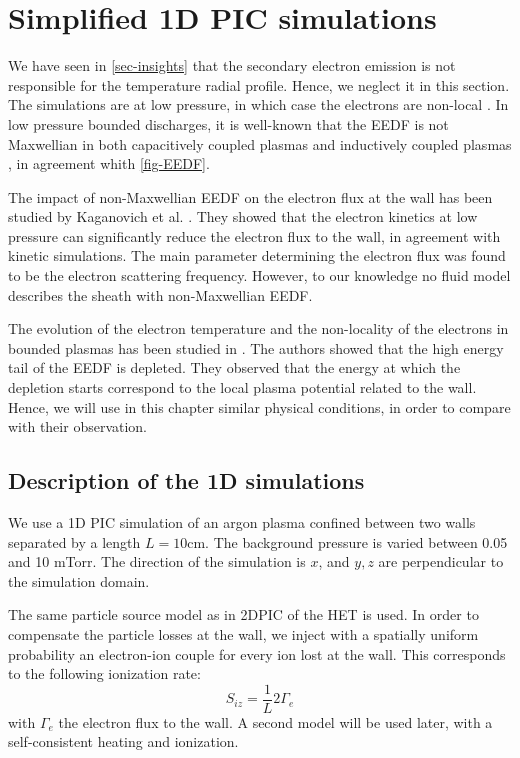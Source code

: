 
\section{Simplified 1D PIC simulations}
  \label{sec-1DPIC}

  We have seen in \cref{sec-insights} that the secondary electron emission is not responsible for the temperature radial profile.
  Hence, we neglect it in this section.
  The simulations are at low pressure, in which case  the electrons are non-local \cite{bernstein1954, godyak1993}.
  In low pressure bounded discharges, it is well-known that the EEDF is not Maxwellian in both capacitively coupled plasmas and inductively coupled plasmas \cite{mouchtouris2016, godyak2002, meige2006a, dominguez-vazquez2018}, in agreement whith \cref{fig-EEDF}.

  The impact of non-Maxwellian EEDF on the electron flux at the wall has been studied by Kaganovich et al. \citep{kaganovich2000,kaganovich2007}.
  They showed that the electron kinetics at low pressure can significantly reduce the electron flux to the wall, in agreement with kinetic simulations.
  The main parameter determining the electron flux was found to be the electron scattering frequency.
  However, to our knowledge no fluid model describes the sheath with non-Maxwellian EEDF.

  The evolution of the electron temperature and the non-locality of the electrons in bounded plasmas has been studied in \citet{meige2006a}.
  The authors showed that the high energy tail of the \ac{EEDF} is depleted.
  They observed that the energy at which the depletion starts correspond to the local plasma potential related to the wall.
  Hence, we will use in this chapter similar physical conditions, in order to compare with their observation.

  \subsection{Description of the \ac{1D} simulations}

    We use a 1D PIC simulation of an argon plasma confined between two walls separated by a length $L=10$cm.
    The background pressure is varied between 0.05 and 10 mTorr.
    The direction of the simulation is $x$, and $y,z$ are perpendicular to the simulation domain.

    The same particle source model as in \ac{2D}\ac{PIC} of the \ac{HET} is used.
    In order to compensate the particle losses at the wall, we inject with a spatially uniform probability an electron-ion couple for every ion lost at the wall.
    This corresponds to the following ionization rate:
    \begin{equation}
      S_{iz} = \frac{1}{L} 2 \Gamma_e
    \end{equation}
    with $\Gamma_e$ the electron flux to the wall.
    A second model will be used later, with a self-consistent heating and ionization.

